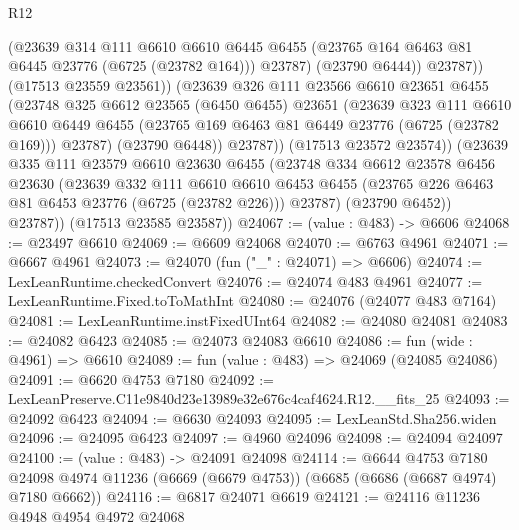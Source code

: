 \begin{lexlean}{R12}
\begin{coremodule}
                    (@23639
                      @314
                      @111
                      @6610
                      @6610
                      @6445
                      @6455
                      (@23765 @164 @6463 @81 @6445 @23776 (@6725 (@23782 @164)))
                      @23787)
                    (@23790 @6444))
                  @23787))
              (@17513 @23559 @23561))
            (@23639
              @326
              @111
              @23566
              @6610
              @23651
              @6455
              (@23748
                @325
                @6612
                @23565
                (@6450 @6455)
                @23651
                (@23639
                  @323
                  @111
                  @6610
                  @6610
                  @6449
                  @6455
                  (@23765 @169 @6463 @81 @6449 @23776 (@6725 (@23782 @169)))
                  @23787)
                (@23790 @6448))
              @23787))
          (@17513 @23572 @23574))
        (@23639
          @335
          @111
          @23579
          @6610
          @23630
          @6455
          (@23748
            @334
            @6612
            @23578
            @6456
            @23630
            (@23639
              @332
              @111
              @6610
              @6610
              @6453
              @6455
              (@23765 @226 @6463 @81 @6453 @23776 (@6725 (@23782 @226)))
              @23787)
            (@23790 @6452))
          @23787))
      (@17513 @23585 @23587))
@24067 := (value : @483) -> @6606
@24068 := @23497 @6610
@24069 := @6609 @24068
@24070 := @6763 @4961
@24071 := @6667 @4961
@24073 := @24070 (fun ("_" : @24071) => @6606)
@24074 := LexLeanRuntime.checkedConvert
@24076 := @24074 @483 @4961
@24077 := LexLeanRuntime.Fixed.toToMathInt
@24080 := @24076 (@24077 @483 @7164)
@24081 := LexLeanRuntime.instFixedUInt64
@24082 := @24080 @24081
@24083 := @24082 @6423
@24085 := @24073 @24083 @6610
@24086 := fun (wide : @4961) => @6610
@24089 := fun (value : @483) => @24069 (@24085 @24086)
@24091 := @6620 @4753 @7180
@24092 := LexLeanPreserve.C11e9840d23e13989e32e676c4caf4624.R12.__fits_25
@24093 := @24092 @6423
@24094 := @6630 @24093
@24095 := LexLeanStd.Sha256.widen
@24096 := @24095 @6423
@24097 := @4960 @24096
@24098 := @24094 @24097
@24100 := (value : @483) -> @24091 @24098
@24114 := @6644
    @4753
    @7180
    @24098
    @4974
    @11236
    (@6669 (@6679 @4753))
    (@6685 (@6686 (@6687 @4974) @7180 @6662))
@24116 := @6817 @24071 @6619
@24121 := @24116 @11236 @4948 @4954 @4972 @24068

\end{coremodule}
\end{lexlean}
